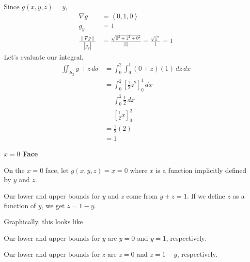 \documentclass{article}
\newcommand{\lrp}[1]{\left( #1 \right)}
\newcommand{\lra}[1]{\left\langle #1 \right\rangle}
\newcommand{\lrb}[1]{\left[ #1 \right]}
\newcommand{\norm}[1]{\left\lVert #1 \right\rVert}
\begin{document}
Since $g(x,y,z)=y$,
\begin{align*}
    \nabla g&=\lra{0,1,0}\\
    g_y&=1\\
    \frac{\norm{\nabla g}}{\left| g_y\right|}&=\frac{\sqrt{0^2+1^2+0^2}}{\left|1\right|}=\frac{\sqrt{1^2}}{1}=1
\end{align*}
Let's evaluate our integral.
\begin{align*}
    \iint_{S_2} y+z\,d\sigma&=\int_0^2\int_0^1\lrp{0+z}\lrp{1}\,dz\,dx\\
    &=\int_0^2\lrb{\frac{1}{2}z^2}_0^1\,dx\\
    &=\int_0^2 \frac{1}{2}\,dx\\
    &=\lrb{\frac{1}{2}x}_0^2\\
    &=\frac{1}{2}(2)\\
    &=1
\end{align*}

{}\textbf{$x=0$ Face}

On the $x=0$ face, let $g(x,y,z)=x=0$ where $x$ is a function implicitly defined by $y$ and $z$. 

Our lower and upper bounds for $y$ and $z$ come from $y+z=1$. If we define $z$ as a function of $y$, we get $z=1-y$.

Graphically, this looks like
\begin{center}
\end{center}

Our lower and upper bounds for $y$ are $y=0$ and $y=1$, respectively.

Our lower and upper bounds for $z$ are $z=0$ and $z=1-y$, respectively.
\end{document}
